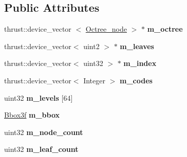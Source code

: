 \subsection*{\-Public \-Attributes}
\begin{DoxyCompactItemize}
\item 
\hypertarget{structnih_1_1_octree__builder_a3c55b9466512a28df3ef0e40a2669a10}{
thrust\-::device\-\_\-vector\*
$<$ \hyperlink{structnih_1_1_octree__node}{\-Octree\-\_\-node} $>$ $\ast$ {\bfseries m\-\_\-octree}}
\label{structnih_1_1_octree__builder_a3c55b9466512a28df3ef0e40a2669a10}

\item 
\hypertarget{structnih_1_1_octree__builder_a1071d744694cdcd3a93538d75e2e9bcb}{
thrust\-::device\-\_\-vector$<$ uint2 $>$ $\ast$ {\bfseries m\-\_\-leaves}}
\label{structnih_1_1_octree__builder_a1071d744694cdcd3a93538d75e2e9bcb}

\item 
\hypertarget{structnih_1_1_octree__builder_a5feded65da8176dc2c7a6669a69d971a}{
thrust\-::device\-\_\-vector$<$ uint32 $>$ $\ast$ {\bfseries m\-\_\-index}}
\label{structnih_1_1_octree__builder_a5feded65da8176dc2c7a6669a69d971a}

\item 
\hypertarget{structnih_1_1_octree__builder_a16b96a11c3758198dee4f3d31b0b3295}{
thrust\-::device\-\_\-vector$<$ \-Integer $>$ {\bfseries m\-\_\-codes}}
\label{structnih_1_1_octree__builder_a16b96a11c3758198dee4f3d31b0b3295}

\item 
\hypertarget{structnih_1_1_octree__builder_aa9e543f03d24ea53b440eec482a95003}{
uint32 {\bfseries m\-\_\-levels} \mbox{[}64\mbox{]}}
\label{structnih_1_1_octree__builder_aa9e543f03d24ea53b440eec482a95003}

\item 
\hypertarget{structnih_1_1_octree__builder_a930342a937ec0c27130d1760444140eb}{
\hyperlink{structnih_1_1_bbox}{\-Bbox3f} {\bfseries m\-\_\-bbox}}
\label{structnih_1_1_octree__builder_a930342a937ec0c27130d1760444140eb}

\item 
\hypertarget{structnih_1_1_octree__builder_ab20ee091a8bc8963750b6231d8b43bb5}{
uint32 {\bfseries m\-\_\-node\-\_\-count}}
\label{structnih_1_1_octree__builder_ab20ee091a8bc8963750b6231d8b43bb5}

\item 
\hypertarget{structnih_1_1_octree__builder_ac04090ebcc2c3a2e25165c477f1d144b}{
uint32 {\bfseries m\-\_\-leaf\-\_\-count}}
\label{structnih_1_1_octree__builder_ac04090ebcc2c3a2e25165c477f1d144b}


\end{DoxyCompactItemize}
